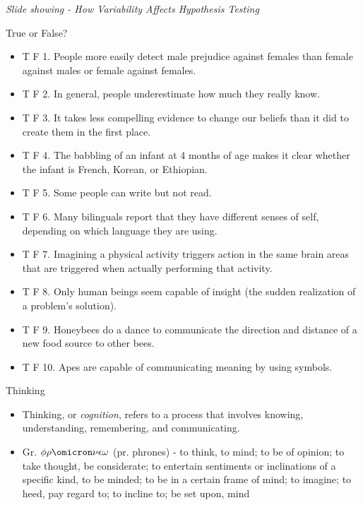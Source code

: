 \documentclass[
]{book}
\providecommand{\tightlist}{%
  \setlength{\itemsep}{0pt}\setlength{\parskip}{0pt}}
\begin{document}
\emph{Slide showing - How Variability Affects Hypothesis Testing}

True or False?

\begin{itemize}
\tightlist
\item
  T F 1. People more easily detect male prejudice against females than female against males or female against females.\\
\item
  T F 2. In general, people underestimate how much they really know.\\
\item
  T F 3. It takes less compelling evidence to change our beliefs than it did to create them in the first place.\\
\item
  T F 4. The babbling of an infant at 4 months of age makes it clear whether the infant is French, Korean, or Ethiopian.\\
\item
  T F 5. Some people can write but not read.\\
\item
  T F 6. Many bilinguals report that they have different senses of self, depending on which language they are using.\\
\item
  T F 7. Imagining a physical activity triggers action in the same brain areas that are triggered when actually performing that activity.\\
\item
  T F 8. Only human beings seem capable of insight (the sudden realization of a problem's solution).\\
\item
  T F 9. Honeybees do a dance to communicate the direction and distance of a new food source to other bees.\\
\item
  T F 10. Apes are capable of communicating meaning by using symbols.
\end{itemize}

Thinking

\begin{itemize}
\tightlist
\item
  Thinking, or \emph{cognition}, refers to a process that involves knowing, understanding, remembering, and communicating.\\
\item
  Gr. \(\phi\rho\omicron\nu\epsilon\omega\) (pr. phrones) - to think, to mind; to be of opinion; to take thought, be considerate; to entertain sentiments or inclinations of a specific kind, to be minded; to be in a certain frame of mind; to imagine; to heed, pay regard to; to incline to; be set upon, mind
\end{itemize}
\end{document}
